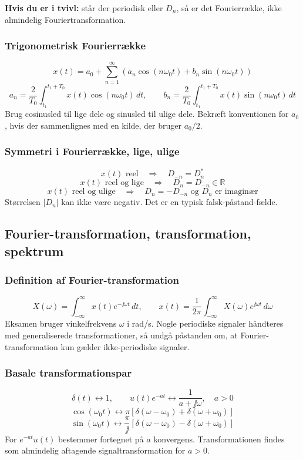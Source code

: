 \textbf{Hvis du er i tvivl:} står der periodisk eller \(D_n\), så er det Fourierrække, ikke almindelig Fouriertransformation.

\subsubsection{Trigonometrisk Fourierrække}
\[
x(t)=a_0+\sum_{n=1}^{\infty}\left(a_n\cos(n\omega_0t)+b_n\sin(n\omega_0t)\right)
\]
\[
a_n=\frac{2}{T_0}\int_{t_1}^{t_1+T_0}x(t)\cos(n\omega_0t)\,dt,\qquad
b_n=\frac{2}{T_0}\int_{t_1}^{t_1+T_0}x(t)\sin(n\omega_0t)\,dt
\]
Brug cosinusled til lige dele og sinusled til ulige dele. Bekræft konventionen for \(a_0\), hvis der sammenlignes med en kilde, der bruger \(a_0/2\).

\subsubsection{Symmetri i Fourierrække, lige, ulige}
\[
x(t)\text{ reel}\quad\Rightarrow\quad D_{-n}=D_n^*
\]
\[
x(t)\text{ reel og lige}\quad\Rightarrow\quad D_n=D_{-n}\in\mathbb{R}
\]
\[
x(t)\text{ reel og ulige}\quad\Rightarrow\quad D_n=-D_{-n}\text{ og }D_n\text{ er imaginær}
\]
Størrelsen \(|D_n|\) kan ikke være negativ. Det er en typisk falsk-påstand-fælde.

\subsection{Fourier-transformation, transformation, spektrum}

\subsubsection{Definition af Fourier-transformation}
\[
X(\omega)=\int_{-\infty}^{\infty}x(t)e^{-\jj\omega t}\,dt,\qquad
x(t)=\frac{1}{2\pi}\int_{-\infty}^{\infty}X(\omega)e^{\jj\omega t}\,d\omega
\]
Eksamen bruger vinkelfrekvens \(\omega\) i rad/s. Nogle periodiske signaler håndteres med generaliserede transformationer, så undgå påstanden om, at Fourier-transformation kun gælder ikke-periodiske signaler.

\subsubsection{Basale transformationspar}
\[
\delta(t)\leftrightarrow 1,\qquad
u(t)e^{-at}\leftrightarrow \frac{1}{a+\jj\omega},\quad a>0
\]
\[
\cos(\omega_0t)\leftrightarrow \pi\left[\delta(\omega-\omega_0)+\delta(\omega+\omega_0)\right]
\]
\[
\sin(\omega_0t)\leftrightarrow \frac{\pi}{\jj}\left[\delta(\omega-\omega_0)-\delta(\omega+\omega_0)\right]
\]
For \(e^{-at}u(t)\) bestemmer fortegnet på \(a\) konvergens. Transformationen findes som almindelig aftagende signaltransformation for \(a>0\).


